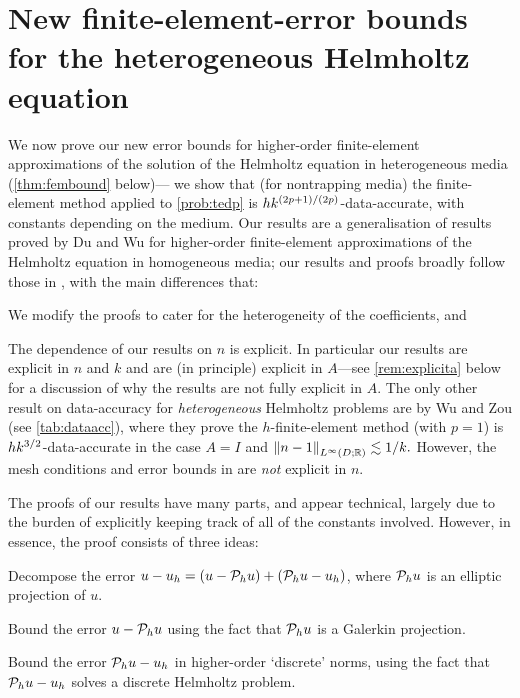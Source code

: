 
\section[FE Bounds for the Heterogeneous Helmholtz Equation]{New finite-element-error bounds for the heterogeneous Helmholtz equation}\label{sec:fem}

We now prove our new error bounds for higher-order finite-element approximations of the solution of the Helmholtz equation in heterogeneous media (\cref{thm:fembound} below)--- we show that (for nontrapping media) the finite-element method applied to \cref{prob:tedp} is $hk^{(2p+1)/(2p)}$-data-accurate, with constants depending on the medium. Our results are a generalisation of results proved by Du and Wu \cite{DuWu:15} for higher-order finite-element approximations of the Helmholtz equation in homogeneous media; our results and proofs broadly follow those in \cite{DuWu:15}, with the main differences that:
\ben
\item We modify the proofs to cater for the heterogeneity of the coefficients, and
\item The dependence of our results on $n$ is explicit.
\een
  In particular our results are explicit in $n$ and $k$ and are (in principle) explicit in $A$---see \cref{rem:explicita} below for a discussion of why the results are not fully explicit in $A$. The only other result on data-accuracy for \emph{heterogeneous} Helmholtz problems are by Wu and Zou \cite[Lemma 3.3]{WuZo:18} (see \cref{tab:dataacc}), where they prove the $h$-finite-element method (with $p=1$) is $hk^{3/2}$-data-accurate in the case $A=I$ and $\NLiDRR{n-1} \lesssim 1/k.$ However, the mesh conditions and error bounds in \cite[Lemma 3.3]{WuZo:18} are \emph{not} explicit in $n.$

The proofs of our results have many parts, and appear technical, largely due to the burden of explicitly keeping track of all of the constants involved. However, in essence, the proof consists of three ideas:
\ben
\item Decompose the error $u-u_{h} = (u - \mathcal P_{h} u) + (\mathcal P_{h} u - u_{h})$, where $\mathcal P_{h} u$ is an elliptic projection of $u$.
\item Bound the error $u - \mathcal P_{h} u$ using the fact that $\mathcal P_{h} u$ is a Galerkin projection.
\item Bound the error $\mathcal P_{h} u - u_{h}$ in higher-order `discrete' norms, using the fact that $\mathcal P_{h} u - u_{h}$ solves a discrete Helmholtz problem.
\een

